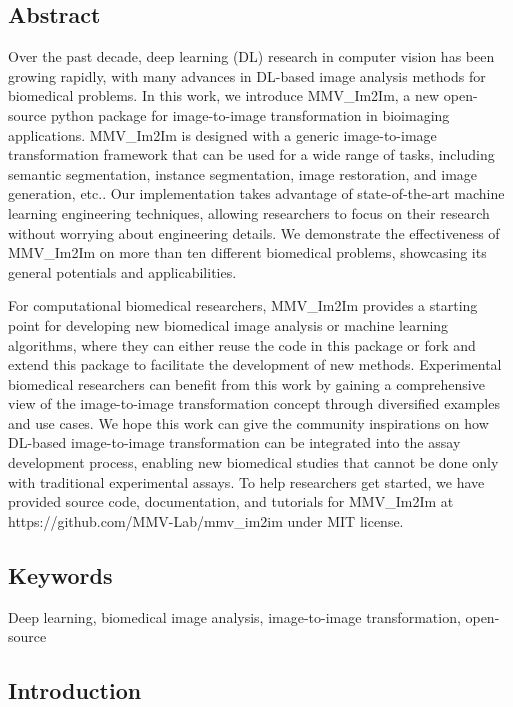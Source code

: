 \hypertarget{abstract}{%
\subsection{Abstract}\label{abstract}}

Over the past decade, deep learning (DL) research in computer vision has been growing rapidly, with many advances in DL-based image analysis methods for biomedical problems. In this work, we introduce MMV\_Im2Im, a new open-source python package for image-to-image transformation in bioimaging applications. MMV\_Im2Im is designed with a generic image-to-image transformation framework that can be used for a wide range of tasks, including semantic segmentation, instance segmentation, image restoration, and image generation, etc.. Our implementation takes advantage of state-of-the-art machine learning engineering techniques, allowing researchers to focus on their research without worrying about engineering details. We demonstrate the effectiveness of MMV\_Im2Im on more than ten different biomedical problems, showcasing its general potentials and applicabilities.

For computational biomedical researchers, MMV\_Im2Im provides a starting point for developing new biomedical image analysis or machine learning algorithms, where they can either reuse the code in this package or fork and extend this package to facilitate the development of new methods. Experimental biomedical researchers can benefit from this work by gaining a comprehensive view of the image-to-image transformation concept through diversified examples and use cases. We hope this work can give the community inspirations on how DL-based image-to-image transformation can be integrated into the assay development process, enabling new biomedical studies that cannot be done only with traditional experimental assays. To help researchers get started, we have provided source code, documentation, and tutorials for MMV\_Im2Im at https://github.com/MMV-Lab/mmv\_im2im under MIT license.

\hypertarget{keywords}{%
\subsection{Keywords}\label{keywords}}

Deep learning, biomedical image analysis, image-to-image transformation, open-source

\hypertarget{introduction}{%
\subsection{Introduction}\label{introduction}}

